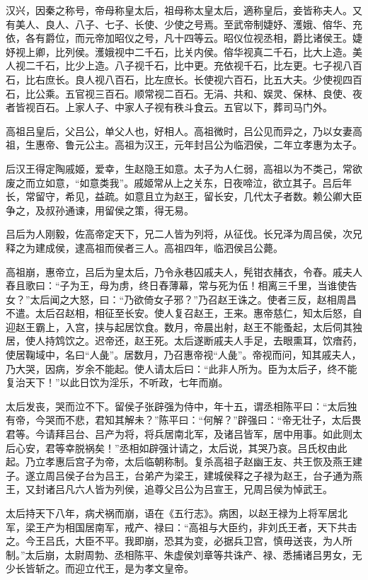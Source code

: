 \documentclass[]{article}
\begin{document}
汉兴，因秦之称号，帝母称皇太后，祖母称太皇太后，適称皇后，妾皆称夫人。又有美人、良人、八子、七子、长使、少使之号焉。至武帝制婕妤、濩娥、傛华、充依，各有爵位，而元帝加昭仪之号，凡十四等云。昭仪位视丞相，爵比诸侯王。婕妤视上卿，比列侯。濩娥视中二千石，比关内侯。傛华视真二千石，比大上造。美人视二千石，比少上造。八子视千石，比中更。充依视千石，比左更。七子视八百石，比右庶长。良人视八百石，比左庶长。长使视六百石，比五大夫。少使视四百石，比公乘。五官视三百石。顺常视二百石。无涓、共和、娱灵、保林、良使、夜者皆视百石。上家人子、中家人子视有秩斗食云。五官以下，葬司马门外。

高祖吕皇后，父吕公，单父人也，好相人。高祖微时，吕公见而异之，乃以女妻高祖，生惠帝、鲁元公主。高祖为汉王，元年封吕公为临泗侯，二年立孝惠为太子。

后汉王得定陶戚姬，爱幸，生赵隐王如意。太子为人仁弱，高祖以为不类己，常欲废之而立如意，``如意类我''。戚姬常从上之关东，日夜啼泣，欲立其子。吕后年长，常留守，希见，益疏。如意且立为赵王，留长安，几代太子者数。赖公卿大臣争之，及叔孙通谏，用留侯之策，得无易。

吕后为人刚毅，佐高帝定天下，兄二人皆为列将，从征伐。长兄泽为周吕侯，次兄释之为建成侯，逮高祖而侯者三人。高祖四年，临泗侯吕公薨。

高祖崩，惠帝立，吕后为皇太后，乃令永巷囚戚夫人，髡钳衣赭衣，令舂。戚夫人舂且歌曰：``子为王，母为虏，终日舂薄幕，常与死为伍！相离三千里，当谁使告女？''太后闻之大怒，曰：``乃欲倚女子邪？''乃召赵王诛之。使者三反，赵相周昌不遣。太后召赵相，相征至长安。使人复召赵王，王来。惠帝慈仁，知太后怒，自迎赵王霸上，入宫，挟与起居饮食。数月，帝晨出射，赵王不能蚤起，太后伺其独居，使人持鸩饮之。迟帝还，赵王死。太后遂断戚夫人手足，去眼熏耳，饮瘖药，使居鞠域中，名曰``人彘''。居数月，乃召惠帝视``人彘''。帝视而问，知其戚夫人，乃大哭，因病，岁余不能起。使人请太后曰：``此非人所为。臣为太后子，终不能复治天下！''以此日饮为淫乐，不听政，七年而崩。

太后发丧，哭而泣不下。留侯子张辟强为侍中，年十五，谓丞相陈平曰：``太后独有帝，今哭而不悲，君知其解未？''陈平曰：``何解？''辟强曰：``帝无壮子，太后畏君等。今请拜吕台、吕产为将，将兵居南北军，及诸吕皆军，居中用事。如此则太后心安，君等幸脱祸矣！''丞相如辟强计请之，太后说，其哭乃哀。吕氏权由此起。乃立孝惠后宫子为帝，太后临朝称制。复杀高祖子赵幽王友、共王恢及燕王建子。遂立周吕侯子台为吕王，台弟产为梁王，建城侯释之子禄为赵王，台子通为燕王，又封诸吕凡六人皆为列侯，追尊父吕公为吕宣王，兄周吕侯为悼武王。

太后持天下八年，病犬祸而崩，语在《五行志》。病困，以赵王禄为上将军居北军，梁王产为相国居南军，戒产、禄曰：``高祖与大臣约，非刘氏王者，天下共击之。今王吕氏，大臣不平。我即崩，恐其为变，必据兵卫宫，慎毋送丧，为人所制。''太后崩，太尉周勃、丞相陈平、朱虚侯刘章等共诛产、禄、悉捕诸吕男女，无少长皆斩之。而迎立代王，是为孝文皇帝。
\end{document}
